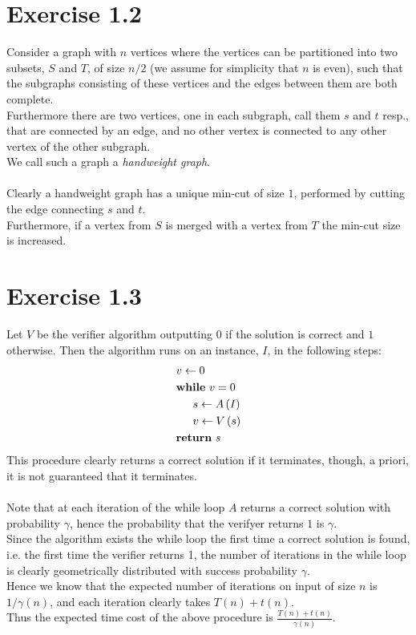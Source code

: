 \documentclass[11pt]{article}
\title{}
\author{}
\date{}
\begin{document}
\section*{Exercise 1.2}
Consider a graph with $n$ vertices where the vertices can be partitioned into two subsets, $S$ and $T$, of size $n/2$
(we assume for simplicity that $n$ is even), 
such that the subgraphs consisting of these vertices and the edges between them are both complete. \\
Furthermore there are two vertices, one in each subgraph, call them $s$ and $t$ resp., 
that are connected by an edge,
and no other vertex is connected to any other vertex of the other subgraph. \\
We call such a graph a \textit{handweight graph}. \\ \\
Clearly a handweight graph has a unique min-cut of size $1$, performed by cutting the edge connecting $s$ and $t$. \\
Furthermore, if a vertex from $S$ is merged with a vertex from $T$ the min-cut size is increased.
\section*{Exercise 1.3}
Let $V$ be the verifier algorithm outputting $0$ if the solution is correct and $1$ otherwise. 
Then the algorithm runs on an instance, $I$, in the following steps:
\begin{align*}
	& v \leftarrow 0 \\
	& \textbf{while} \ v =0 \\
	& \indent s \leftarrow A\left( I \right) \\
	& \indent v \leftarrow V\left( s \right) \\
	& \textbf{return} \ s
\end{align*}
This procedure clearly returns a correct solution if it terminates, 
though, a priori, it is not guaranteed that it terminates. \\ \\
Note that at each iteration of the while loop $A$ returns a correct solution with probability $\gamma$,
hence the probability that the verifyer returns $1$ is $\gamma$. \\
Since the algorithm exists the while loop the first time a correct solution is found, i.e. the first time the verifier returns 1,
the number of iterations in the while loop is clearly geometrically distributed with success probability $\gamma$. \\
Hence we know that the expected number of iterations on input of size $n$ is $1/\gamma(n)$,
and each iteration clearly takes $T(n)+t(n)$. \\
Thus the expected time cost of the above procedure is $\frac{T(n)+t(n)}{\gamma(n)}$.
\end{document}
